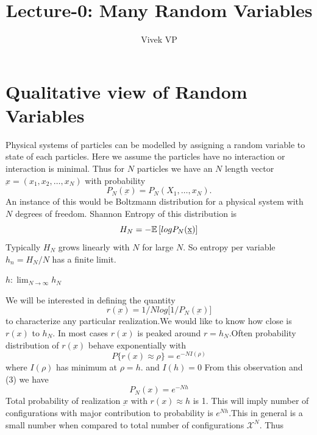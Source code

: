 \documentclass[letterpaper,english,12pt]{article}
\title{Lecture-0: Many Random Variables}
\author{Vivek VP}
\begin{document}
\maketitle
\section{Qualitative view of Random Variables}
Physical systems of particles can be modelled by assigning a random variable to state of each particles. Here we assume the particles have no interaction or interaction is minimal. Thus for $N$ particles we have an $N$ length vector $\underbar x = (x_1,x_2,\dots ,x_N)$ with probability 
\begin{equation}
  P_N(\underbar x) = P_N(X_1,\dots ,x_N) .
\end{equation}
An instance of this would be Boltzmann distribution for a physical system with $N$ degrees of freedom. Shannon Entropy of this distribution is 
  \begin{equation}
      H_N = -\mathbb{E}\left[log P_N(\underbar x) \right]
  \end{equation}
  Typically $H_N$ grows linearly with $N$ for large $N$. So entropy per variable $h_n=H_N/N$ has a finite limit.
  \begin{defn}
  $h: \lim_{N\to\infty} h_N $
  \end{defn}
  We will be interested in defining the quantity 
  \begin{equation}
      r(\underbar x) = 1/N log \big[ 1/P_N(\underbar x)\big]
  \end{equation}
  to characterize any particular realization.We would like to know how close is $r(x)$ to $h_N$. In most cases $r(x)$ is peaked around $r=h_N$.Often probability distribution of $r(\underbar x)$ behave exponentially with 
  \begin{equation}
   P\lbrace r(x) \approx \rho \rbrace=e^{-NI(\rho)}
   \end{equation}
   where
   $I(\rho)$ has minimum at $\rho = h$.
   and $I(h)=0$
   From this observation and (3) we have 
   \begin{equation}
       P_N(x) = e^{-Nh}
   \end{equation}
   Total probability of realization $\underbar x$ with $r(x) \approx h$ is 1. This will imply number of configurations with major contribution to probability is $e^{Nh}. $This in general is a  small number when compared to total number of configurations $\mathcal{X}^N$. Thus 
\end{document}
